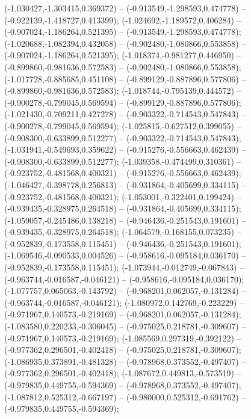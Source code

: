  (-1.030427,-1.303415,0.369372) -- (-0.913549,-1.298593,0.474778) -- (-0.922139,-1.418727,0.413399);
 (-1.024692,-1.189572,0.406284) -- (-0.907024,-1.186264,0.521395) -- (-0.913549,-1.298593,0.474778);
 (-1.020688,-1.082394,0.432058) -- (-0.902480,-1.080866,0.553858) -- (-0.907024,-1.186264,0.521395);
 (-1.018374,-0.981277,0.446950) -- (-0.899860,-0.981636,0.572583) -- (-0.902480,-1.080866,0.553858);
 (-1.017728,-0.885685,0.451108) -- (-0.899129,-0.887896,0.577806) -- (-0.899860,-0.981636,0.572583);
 (-1.018744,-0.795139,0.444572) -- (-0.900278,-0.799045,0.569594) -- (-0.899129,-0.887896,0.577806);
 (-1.021430,-0.709211,0.427278) -- (-0.903322,-0.714543,0.547843) -- (-0.900278,-0.799045,0.569594);
 (-1.025815,-0.627512,0.399055) -- (-0.908300,-0.633899,0.512277) -- (-0.903322,-0.714543,0.547843);
 (-1.031941,-0.549693,0.359622) -- (-0.915276,-0.556663,0.462439) -- (-0.908300,-0.633899,0.512277);
 (-1.039358,-0.474499,0.310361) -- (-0.923752,-0.481568,0.400321) -- (-0.915276,-0.556663,0.462439);
 (-1.046427,-0.398778,0.256813) -- (-0.931864,-0.405699,0.334115) -- (-0.923752,-0.481568,0.400321);
 (-1.053001,-0.322401,0.199424) -- (-0.939435,-0.328975,0.264518) -- (-0.931864,-0.405699,0.334115);
 (-1.059057,-0.245486,0.138218) -- (-0.946436,-0.251543,0.191601) -- (-0.939435,-0.328975,0.264518);
 (-1.064579,-0.168155,0.073235) -- (-0.952839,-0.173558,0.115451) -- (-0.946436,-0.251543,0.191601);
 (-1.069546,-0.090533,0.004526) -- (-0.958616,-0.095184,0.036170) -- (-0.952839,-0.173558,0.115451);
 (-1.073944,-0.012749,-0.067843) -- (-0.963744,-0.016587,-0.046121) -- (-0.958616,-0.095184,0.036170);
 (-1.077757,0.065063,-0.143792) -- (-0.968201,0.062057,-0.131284) -- (-0.963744,-0.016587,-0.046121);
 (-1.080972,0.142769,-0.223229) -- (-0.971967,0.140573,-0.219169) -- (-0.968201,0.062057,-0.131284);
 (-1.083580,0.220233,-0.306045) -- (-0.975025,0.218781,-0.309607) -- (-0.971967,0.140573,-0.219169);
 (-1.085569,0.297319,-0.392122) -- (-0.977362,0.296501,-0.402418) -- (-0.975025,0.218781,-0.309607);
 (-1.086935,0.373891,-0.481328) -- (-0.978968,0.373552,-0.497407) -- (-0.977362,0.296501,-0.402418);
 (-1.087672,0.449813,-0.573519) -- (-0.979835,0.449755,-0.594369) -- (-0.978968,0.373552,-0.497407);
 (-1.087812,0.525312,-0.667197) -- (-0.980000,0.525312,-0.691762) -- (-0.979835,0.449755,-0.594369);
